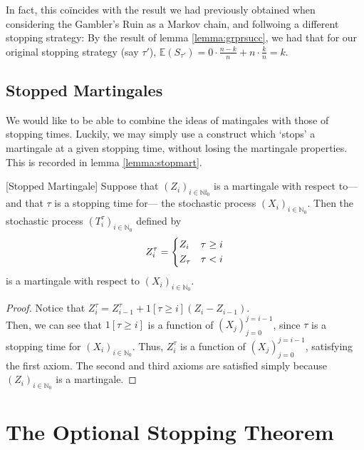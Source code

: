 	In fact, this co\"incides with the result we had previously obtained when considering the 
	Gambler's Ruin as a Markov chain, and follwoing a different stopping strategy: By the 
	result of lemma \ref{lemma:grprsucc}, we had that for our original stopping strategy (say 
	$\tau'$), $\mathbb{E}(S_{\tau'}) = 0 \cdot \frac{n-k}{n} + n \cdot \frac{k}{n} = k$.  

	\subsection{Stopped Martingales}
	We would like to be able to combine the ideas of matingales with those of stopping times.
	Luckily, we may simply use a construct which `stops' a martingale at a given stopping time,
	without losing the martingale properties. This is recorded in lemma \ref{lemma:stopmart}.
	\begin{lemma}
		\label{lemma:stopmart}[Stopped Martingale]
		Suppose that $(Z_i)_{i\in\mathbb{Ni}_0}$ is a martingale with respect to---and that 
		$\tau$ is a stopping time for--- the stochastic process $(X_i)_{i\in\mathbb{N}_0}$.
		Then the stochastic process $(T^\tau_i)_{i\in\mathbb{N}_0}$ defined by 
		$$
			Z^\tau_i = 
			\begin{dcases}
				Z_i & \tau \geq i \\
				Z_\tau & \tau < i
			\end{dcases}
		$$
		is a martingale with respect to $(X_i)_{i\in\mathbb{N}_0}$.
	\end{lemma}
	\begin{proof}
		Notice that $Z^\tau_i = Z^\tau_{i-1} + 1[\tau \geq i](Z_i - Z_{i-1})$.\\
		Then, we can see that $1[\tau \geq i]$ is a function of $(X_j)_{j=0}^{j=i-1}$,
		since $\tau$ is a stopping time for $(X_i)_{i\in\mathbb{N}_0}$. Thus, $Z_i^\tau$ is
		a function of $(X_j)_{j=0}^{j=i-1}$, satisfying the first axiom. The second and 
		third axioms are satisfied simply because $(Z_i)_{i\in\mathbb{N}_0}$ is a martingale.
	\end{proof}
	
\section{The Optional Stopping Theorem}




